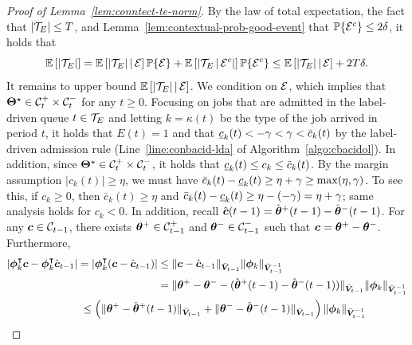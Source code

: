 \begin{proof}[Proof of Lemma~\ref{lem:conntect-te-norm}]
By the law of total expectation, the fact that $|\mathcal{T}_E| \leq T$, and Lemma~\ref{lem:contextual-prob-good-event} that $\mathbb{P}\{\mathcal{E}^c\} \leq 2\delta$, it holds that 
\begin{equation}\label{eq:te-condition-expect}
    \mathbb E\left[|\mathcal{T}_E|\right] = \mathbb E\left[|\mathcal{T}_E| \,\middle\vert\, \mathcal{E}\right]\mathbb{P}\{\mathcal{E}\} + \mathbb E\left[|\mathcal{T}_E \,\middle\vert\, \mathcal{E}^c|\right]\mathbb{P}\{\mathcal{E}^c\} \leq \mathbb E\left[|\mathcal{T}_E| \,\middle\vert\, \mathcal{E}\right] + 2T\delta.
\end{equation}
It remains to upper bound $\mathbb E\left[|\mathcal{T}_E| \,\middle\vert\, \mathcal{E}\right]$. We condition on $\mathcal{E}$, which implies that $\boldsymbol{\Theta}^\star \in \mathcal{C}_t^+ \times \mathcal{C}_t^-$ for any $t \geq 0$. Focusing on jobs that are admitted in the label-driven queue $t \in \mathcal{T}_E$ and letting $k = \kappa(t)$ be the type of the job arrived in period $t$, it holds that $E(t) = 1$ and that $\underline{c}_k(t) < -\gamma< \gamma < \bar{c}_k(t)$ by the label-driven admission rule (Line~\ref{line:conbacid-lda} of Algorithm~\ref{algo:cbacidol}). In addition, since $\boldsymbol{\Theta}^\star \in \mathcal{C}_t^+ \times \mathcal{C}_t^-$, it holds that $\underline{c}_k(t) \leq c_k \leq \bar{c}_k(t)$. By the margin assumption $|c_k(t)| \geq \eta$, we must have $\bar{c}_k(t) - \underline{c}_k(t) \geq \eta + \gamma \geq \max(\eta,\gamma)$. To see this, if $c_k \geq 0$, then $\bar{c}_k(t) \geq \eta$ and $\bar{c}_k(t) - \underline{c}_k(t) \geq \eta - (-\gamma) = \eta + \gamma$; same analysis holds for $c_k < 0$. In addition, recall $\hat{\boldsymbol{c}}(t-1) = \hat{\boldsymbol{\theta}}^+(t-1) - \hat{\boldsymbol{\theta}}^-(t-1)$. For any $\boldsymbol{c} \in \mathcal{C}_{t-1}$, there exists $\boldsymbol{\theta}^+ \in \mathcal{C}^+_{t-1}$ and $\boldsymbol{\theta}^- \in \mathcal{C}^-_{t-1}$ such that $\boldsymbol{c} = \boldsymbol{\theta}^+ - \boldsymbol{\theta}^-$. Furthermore,
\begin{align*}
\left|\bphi_k^{\trans}\bolds{c} - \bphi_k^{\trans}\hat{\bolds{c}}_{t-1}\right| = \left|\bphi_k^{\trans}(\bolds{c} - \hat{\bolds{c}}_{t-1})\right| &\leq \|\bolds{c}-\hat{\bolds{c}}_{t-1}\|_{\bar{\bolds{V}}_{t-1}}\|\bphi_k\|_{\bar{\bolds{V}}_{t-1}^{-1}} \\
&= \|\btheta^+ - \btheta^- - (\hat{\btheta}^+(t-1) - \hat{\btheta}^-(t-1))\|_{\bar{\bolds{V}}_{t-1}}\|\bphi_k\|_{\bar{\bolds{V}}_{t-1}^{-1}} \\
&\hspace{-1in}\leq \left(\|\btheta^+- \hat{\btheta}^+(t-1)\|_{\bar{\bolds{V}}_{t-1}} + \|\btheta^- - \hat{\btheta}^-(t-1)\|_{\bar{\bolds{V}}_{t-1}}\right)\|\bphi_k\|_{\bar{\bolds{V}}_{t-1}^{-1}} \\

\end{align*}
\end{proof}
